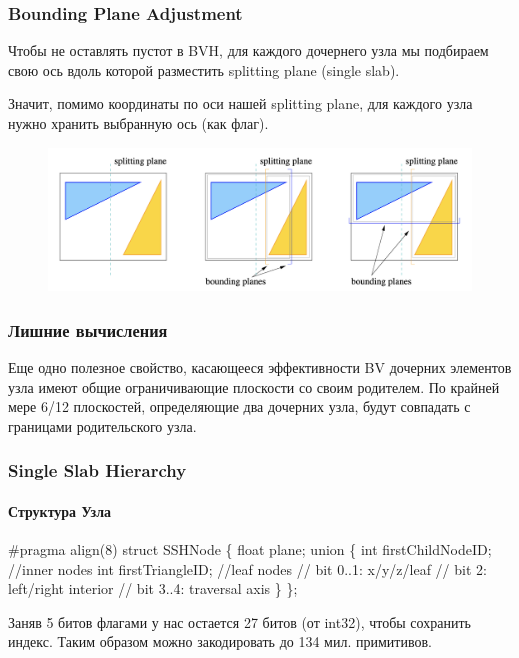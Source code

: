 \documentclass{beamer}
\begin{document}
\begin{frame}
    \frametitle{Bounding Plane Adjustment}
    Чтобы не оставлять пустот в BVH, для каждого дочернего узла мы подбираем
    свою ось вдоль которой разместить splitting plane (single slab).

    Значит, помимо координаты по оси нашей splitting plane, для каждого узла нужно
    хранить выбранную ось (как флаг).
    \begin{figure}
        \includegraphics[keepaspectratio, width=\textwidth]{res/splitting_ssh.png}
    \end{figure}
\end{frame}

\begin{frame}
    \frametitle{Лишние вычисления}
    \begin{block}{Еще одно полезное свойство, касающееся эффективности}
        BV дочерних элементов узла имеют общие ограничивающие плоскости со своим родителем.
        По крайней мере 6/12 плоскостей, определяющие два дочерних узла, будут совпадать
        с границами родительского узла.
    \end{block}
\end{frame}

\begin{frame}[fragile]
    \frametitle{Single Slab Hierarchy}
    \framesubtitle{Структура Узла}

    \begin{semiverbatim}
        #pragma align(8)
        struct SSHNode \{
            float plane;
            union \{
                int firstChildNodeID; //inner nodes
                int firstTriangleID; //leaf nodes
                // bit 0..1: x/y/z/leaf
                // bit 2: left/right interior
                // bit 3..4: traversal axis
            \}
        \};
    \end{semiverbatim}
    Заняв 5 битов флагами у нас остается 27 битов (от int32),
    чтобы сохранить индекс.
    Таким образом можно закодировать до 134 мил. примитивов.

\end{frame}
\end{document}
